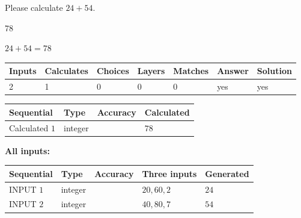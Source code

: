 \documentclass[12pt]{article}
\begin{document}
  
 
Please calculate $ %
24 +  %
54 $.
 
 
 
\noindent{}
 
 

78
 
 
\noindent{}
 
 

 
 
 
\noindent{}
 
 

$ %
24 +  %
54=   %
78$
 
 
\noindent{}
 
 

 
   
   
   
   
\noindent\begin{tabular}{|l|l|l|l|l|l|l|}
 \hline
Inputs & Calculates & Choices & Layers & Matches & Answer & Solution \\ \hline
 2  & 
 1  & 
 0
  & 
 0  & 
 0  & 
  yes & 
  yes 
  \\ \hline
 \end{tabular}
   
   
   
   
\noindent{}
   
   
  
  
\noindent\begin{tabular}{|l|l|l|l|}
\hline
 Sequential & Type & Accuracy & Calculated \\ 
\hline
 
 
  Calculated $  1 $ & integer &  & 
  $ 78 $ 
 \\  \hline  
 \end{tabular}
   
   
   
   
\noindent\vspace{0.1in}\hspace{-0.08in} {\textbf{\Large{All inputs: }}}
   
   
  
  
\noindent\begin{tabular}{|l|l|l|l|l|}
\hline
 Sequential & Type & Accuracy & Three inputs & Generated \\ 
\hline
 
 
  INPUT $  1 $ & integer &  & $
 20
 , 
 60
 , 
 2
 $ & $ 24 $ 
 \\  \hline  
 
 
  INPUT $  2 $ & integer &  & $
 40
 , 
 80
 , 
 7
 $ & $ 54 $ 
 \\  \hline  
 \end{tabular}
   
\end{document}
